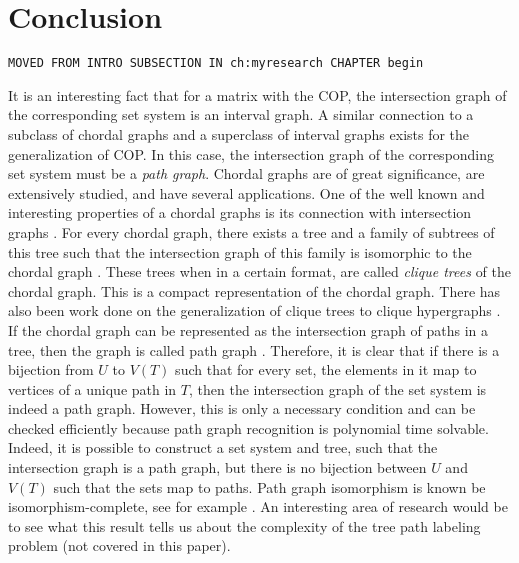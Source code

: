 \chapter{Conclusion}
\label{ch:conclusion}

%



\begin{center} {\tt MOVED FROM INTRO SUBSECTION IN ch:myresearch
    CHAPTER begin}
\end{center}

It is an interesting fact that for a matrix with the COP, the
intersection graph of the corresponding set system is an interval
graph. %
A similar connection to a subclass of chordal graphs and a superclass
of interval graphs exists for the generalization of COP.  In this
case, the intersection graph of the corresponding set system must be a
{\em path graph}. Chordal graphs are of great significance, are
extensively studied, and have several applications.  One of the well
known and interesting properties of a chordal graphs is its connection
with intersection graphs \cite{mcg04}. For every chordal graph, there
exists a tree and a family of subtrees of this tree such that the
intersection graph of this family is isomorphic to the chordal graph
\cite{plr70,gav78,bp93}.  These trees when in a certain format, are
called {\em clique trees} \cite{apy92} of the chordal graph. This is a
compact representation of the chordal graph. There has also been work
done on the generalization of clique trees to clique hypergraphs
\cite{km02}.  If the chordal graph can be represented as the
intersection graph of paths in a tree, then the graph is called path
graph \cite{mcg04}.  Therefore, it is clear that if there is a
bijection from $U$ to $V(T)$ such that for every set, the elements in
it map to vertices of a unique path in $T$, then the intersection
graph of the set system is indeed a path graph.  However, this is only
a necessary condition and can be checked efficiently because path
graph recognition is polynomial time
solvable\cite{gav78,aas93}. Indeed, it is possible to construct a set
system and tree, such that the intersection graph is a path graph, but
there is no bijection between $U$ and $V(T)$ such that the sets map to
paths. Path graph isomorphism is known be isomorphism-complete, see
for example \cite{kklv10}. An interesting area of research would be to
see what this result tells us about the complexity of the tree path
labeling problem (not covered in this paper).

